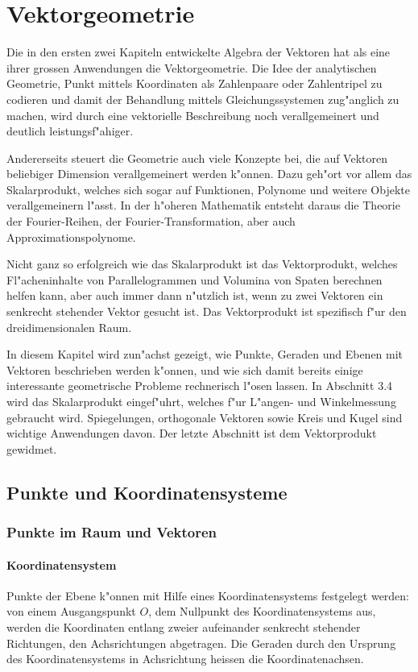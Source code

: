\chapter{Vektorgeometrie\label{chapter-vektorgeometrie}}
Die in den ersten zwei Kapiteln entwickelte Algebra der Vektoren
hat als eine ihrer grossen Anwendungen die Vektorgeometrie.
Die
Idee der analytischen Geometrie, Punkt mittels Koordinaten als Zahlenpaare
oder Zahlentripel zu codieren und damit der Behandlung mittels
Gleichungssystemen zug"anglich zu machen, wird durch eine
vektorielle Beschreibung noch verallgemeinert und deutlich leistungsf"ahiger.

Andererseits steuert die Geometrie auch viele Konzepte bei, die auf
Vektoren beliebiger Dimension verallgemeinert werden k"onnen.
Dazu geh"ort vor allem das Skalarprodukt, welches sich sogar auf
Funktionen, Polynome und weitere Objekte verallgemeinern l"asst.
In der h"oheren Mathematik entsteht daraus die Theorie der Fourier-Reihen,
der Fourier-Transformation, aber auch Approximationspolynome.

Nicht ganz so erfolgreich wie das Skalarprodukt ist das Vektorprodukt,
welches Fl"acheninhalte von Parallelogrammen und Volumina von Spaten
berechnen helfen kann, aber auch immer dann n"utzlich ist, wenn
zu zwei Vektoren ein senkrecht stehender Vektor gesucht ist.
Das Vektorprodukt ist spezifisch f"ur den dreidimensionalen Raum.

In diesem Kapitel wird zun"achst gezeigt, wie Punkte, Geraden und
Ebenen mit Vektoren beschrieben werden k"onnen, und wie sich damit
bereits einige interessante geometrische Probleme rechnerisch l"osen
lassen.
In Abschnitt 3.4 wird das Skalarprodukt eingef"uhrt, welches
f"ur L"angen- und Winkelmessung gebraucht wird.
Spiegelungen, orthogonale
Vektoren sowie Kreis und Kugel sind wichtige Anwendungen davon.
Der letzte Abschnitt ist dem Vektorprodukt gewidmet.

\section{Punkte und Koordinatensysteme}
\subsection{Punkte im Raum und Vektoren}
\subsubsection{Koordinatensystem}
Punkte der Ebene k"onnen mit Hilfe eines Koordinatensystems festgelegt
werden: von einem Ausgangspunkt $O$, dem Nullpunkt des Koordinatensystems
aus, werden die Koordinaten entlang zweier aufeinander senkrecht stehender
Richtungen, den Achsrichtungen abgetragen.
Die Geraden durch den Ursprung
des Koordinatensystems in Achsrichtung heissen die Koordinatenachsen.

